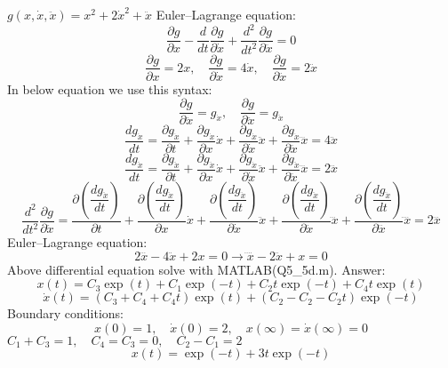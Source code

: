 $g(x, \dot x, \ddot x) = x^2 + 2\dot x^2 + \ddot x$
Euler–Lagrange equation:
$$\dfrac{\partial g}{\partial x} - \dfrac{d}{dt}\dfrac{\partial g}{\partial \dot x} + 
\dfrac{d^2}{dt^2}\dfrac{\partial g}{\partial \ddot x} = 0
$$
$$\dfrac{\partial g}{\partial x} = 2x, \quad 
\dfrac{\partial g}{\partial \dot x} = 4\dot x, \quad 
\dfrac{\partial g}{\partial \ddot x} = 2 \ddot{x}
$$
In below equation we use this syntax:
$$\dfrac{\partial g}{\partial \ddot x} = g_{\dot x}, \quad
\dfrac{\partial g}{\partial \ddot x} = g_{\ddot x}
$$
$$\dfrac{dg_{\dot x}}{dt} = \dfrac{\partial g_{\dot x}}{\partial t} + 
\dfrac{\partial g_{\dot x}}{\partial x} \dot x +
\dfrac{\partial g_{\dot x}}{\partial \dot x} \ddot x +
\dfrac{\partial g_{\dot x}}{\partial \ddot x} \dddot x = 4 \ddot x
$$
$$\dfrac{dg_{\ddot x}}{dt} = \dfrac{\partial g_{\ddot x}}{\partial t} + 
\dfrac{\partial g_{\ddot x}}{\partial x} \dot x +
\dfrac{\partial g_{\ddot x}}{\partial \dot x} \ddot x +
\dfrac{\partial g_{\ddot x}}{\partial \ddot x} \dddot x = 2 \dddot x
$$
$$ \dfrac{d^2}{dt^2}\dfrac{\partial g}{\partial \ddot x} = \dfrac{\partial (\dfrac{dg_{\ddot x}}{dt})}{\partial t} + 
\dfrac{\partial (\dfrac{dg_{\ddot x}}{dt})}{\partial  x} \dot x +
\dfrac{\partial (\dfrac{dg_{\ddot x}}{dt})}{\partial \dot x} \ddot x +
\dfrac{\partial (\dfrac{dg_{\ddot x}}{dt})}{\partial \ddot x} \dddot x +
\dfrac{\partial (\dfrac{dg_{\ddot x}}{dt})}{\partial \dddot x} \ddddot x
 = 2 \ddddot x
$$
Euler–Lagrange equation:
$$2 \ddddot x - 4\ddot x + 2 x = 0 \to \ddddot x - 2\ddot x +  x = 0 $$
Above differential equation solve with MATLAB(Q5\_5d.m).
Answer:
$$x(t) = C_3\exp(t) + C_1\exp(-t) + C_2t\exp(-t) + C_4t\exp(t)$$
$$\dot x(t) = (C_3 + C_4 + C_4t)\exp(t) + (C_2 -C_2 -C_2t)\exp(-t)$$
Boundary conditions:
$$x(0) = 1, \quad \dot x(0) = 2, \quad x(\infty) = \dot x(\infty) = 0 $$
$C_1 + C_3  = 1, \quad C_4 = C_3  = 0,\quad C_2 - C_1 = 2 $
$$x(t) =  \exp(-t) + 3t\exp(-t) $$